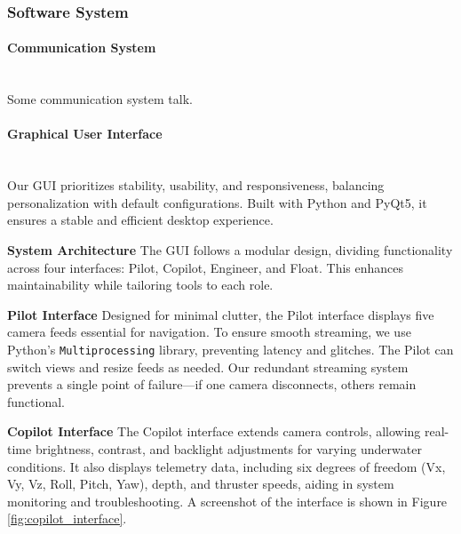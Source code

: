 \subsubsection{Software System}

\paragraph{Communication System} \ \\
\vspace{-0.5cm}
Some communication system talk.

\paragraph{Graphical User Interface} \ \\
Our GUI prioritizes stability, usability, and responsiveness, balancing personalization with default configurations. Built with Python and PyQt5, it ensures a stable and efficient desktop experience.

\vspace{0.2cm}
\textbf{System Architecture}
The GUI follows a modular design, dividing functionality across four interfaces: Pilot, Copilot, Engineer, and Float. This enhances maintainability while tailoring tools to each role.

\vspace{0.2cm}
\textbf{Pilot Interface}
Designed for minimal clutter, the Pilot interface displays five camera feeds essential for navigation. To ensure smooth streaming, we use Python's \texttt{Multiprocessing} library, preventing latency and glitches. The Pilot can switch views and resize feeds as needed. Our redundant streaming system prevents a single point of failure—if one camera disconnects, others remain functional. 

\vspace{0.2cm}
\textbf{Copilot Interface}
The Copilot interface extends camera controls, allowing real-time brightness, contrast, and backlight adjustments for varying underwater conditions. It also displays telemetry data, including six degrees of freedom (Vx, Vy, Vz, Roll, Pitch, Yaw), depth, and thruster speeds, aiding in system monitoring and troubleshooting. A screenshot of the interface is shown in Figure \ref{fig:copilot_interface}.

